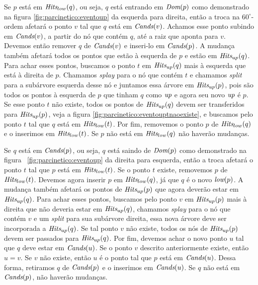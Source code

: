 Se $p$ está em $\textit{Hits}_{low}(q)$, ou seja, $q$ está entrando em
$\textit{Dom}(p)$ como demonstrado na figura \ref{fig:parcinetico:eventoup}
da esquerda para direita, então a troca na $60^\circ$-ordem afetará
o ponto $v$ tal que $q$ está em $\textit{Cands}(v)$. Achamos esse ponto
subindo em $\textit{Cands}(v)$, a partir do nó que contém $q$, até a raiz
que aponta para $v$. Devemos então remover $q$ de $\textit{Cands}(v)$ e
inseri-lo em $\textit{Cands}(p)$. A mudança também afetará todos os pontos
que estão à esquerda de $p$ e estão em $\textit{Hits}_{up}(q)$. Para achar
esses pontos, buscamos o ponto $t$ em $\textit{Hits}_{up}(q)$ mais à
esquerda que está à direita de $p$. Chamamos \textit{splay} para o
nó que contém $t$ e chamamos \textit{split} para a subárvore
esquerda desse nó e juntamos essa árvore em $\textit{Hits}_{up}(p)$, pois
são todos os pontos à esquerda de $p$ que tinham $q$ como $\textit{up}$ e
agora seu novo $\textit{up}$ é $p$. Se esse ponto $t$ não existe, todos os
pontos de $\textit{Hits}_{up}(q)$ devem ser transferidos para
$\textit{Hits}_{up}(p)$, veja a figura
\ref{fig:parcinetico:eventouptnaoexiste}, e buscamos pelo ponto $t$
tal que $q$ está em $\textit{Hits}_{low}(t)$. Por fim, removemos o ponto $p$
de $\textit{Hits}_{low}(q)$ e o inserimos em $\textit{Hits}_{low}(t)$. Se $p$ não
está em $\textit{Hits}_{low}(q)$ não haverão mudanças.

Se $q$ está em $\textit{Cands}(p)$, ou seja, $q$ está saindo de $\textit{Dom}(p)$
como demonstrado na figura~ \ref{fig:parcinetico:eventoup} da
direita para esquerda, então a troca afetará o ponto $t$ tal que $p$
está em $\textit{Hits}_{low}(t)$. Se o ponto $t$ existe, removemos $p$ de
$\textit{Hits}_{low}(t)$. Devemos agora inserir $p$ em $\textit{Hits}_{low}(q)$, já
que $q$ é o novo $\textit{low}(p)$. A mudança também afetará os pontos de
$\textit{Hits}_{up}(p)$ que agora deverão estar em $\textit{Hits}_{up}(q)$. Para
achar esses pontos, buscamos pelo ponto $v$ em $\textit{Hits}_{up}(p)$ mais
à direita que não deveria estar em $\textit{Hits}_{up}(q)$, chamamos
\textit{splay} para o nó que contém $v$ e um \textit{split} para sua
subárvore direita, essa nova árvore deve ser incorporada a
$\textit{Hits}_{up}(q)$. Se tal ponto $v$ não existe, todos os nós de
$\textit{Hits}_{up}(p)$ devem ser passados para $\textit{Hits}_{up}(q)$. Por fim,
devemos achar o novo ponto $u$ tal que $q$ deve estar em
$\textit{Cands}(u)$. Se o ponto $v$ descrito anteriormente existe, então $u
= v$. Se $v$ não existe, então $u$ é o ponto tal que $p$ está em
$\textit{Cands}(u)$. Dessa forma, retiramos $q$ de $\textit{Cands}(p)$ e o inserimos
em $\textit{Cands}(u)$. Se $q$ não está em $\textit{Cands}(p)$, não haverão
mudanças.





